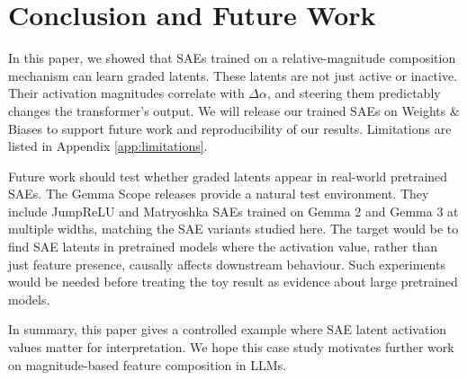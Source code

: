 \section{Conclusion and Future Work}

In this paper, we showed that SAEs trained on a relative-magnitude composition mechanism can learn graded latents. These latents are not just active or inactive. Their activation magnitudes correlate with $\Delta\alpha$, and steering them predictably changes the transformer's output.
We will release our trained SAEs on Weights \& Biases to support future work and reproducibility of our results.
Limitations are listed in Appendix \ref{app:limitations}.

Future work should test whether graded latents appear in real-world pretrained SAEs.
The Gemma Scope releases \citep{lieberum2024gemma,mcdougall2025gemmascope2} provide a natural test environment. They include JumpReLU and Matryoshka SAEs trained on Gemma 2 and Gemma 3 at multiple widths, matching the SAE variants studied here. The target would be to find SAE latents in pretrained models where the activation value, rather than just feature presence, causally affects downstream behaviour.
Such experiments would be needed before treating the toy result as evidence about large pretrained models.


In summary, this paper gives a controlled example where SAE latent activation values matter for interpretation. We hope this case study motivates further work on magnitude-based feature composition in LLMs.
